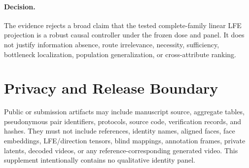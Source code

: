 \documentclass[10pt,twocolumn,letterpaper]{article}
\begin{document}
\paragraph{Decision.}
The evidence rejects a broad claim that the tested complete-family linear LFE
projection is a robust causal controller under the frozen dose and panel.  It
does not justify information absence, route irrelevance, necessity,
sufficiency, bottleneck localization, population generalization, or
cross-attribute ranking.

\section{Privacy and Release Boundary}

Public or submission artifacts may include manuscript source, aggregate tables,
pseudonymous pair identifiers, protocols, source code, verification records,
and hashes.  They must not include references, identity names, aligned faces,
face embeddings, LFE/direction tensors, blind mappings, annotation frames,
private latents, decoded videos, or any reference-corresponding generated
video.  This supplement intentionally contains no qualitative identity panel.
\end{document}
